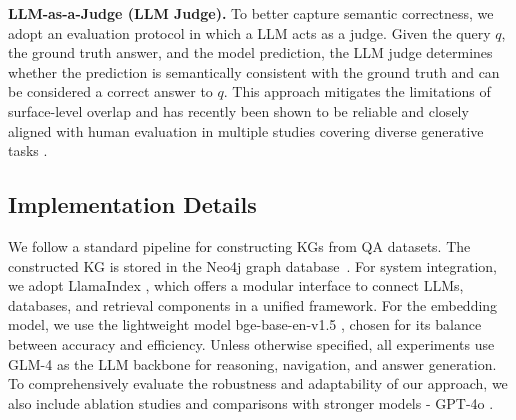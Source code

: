 \documentclass{article}
\theoremstyle{plain}
\theoremstyle{definition}
\theoremstyle{remark}
\begin{document}
\textbf{LLM-as-a-Judge (LLM Judge).}
To better capture semantic correctness, we adopt an evaluation protocol in which a LLM acts as a judge. Given the query $q$, the ground truth answer, and the model prediction, the LLM judge determines whether the prediction is semantically consistent with the ground truth and can be considered a correct answer to $q$. This approach mitigates the limitations of surface-level overlap and has recently been shown to be reliable and closely aligned with human evaluation in multiple studies covering diverse generative tasks \citep{gu2024survey}.

\subsection{Implementation Details}

We follow a standard pipeline for constructing KGs from QA datasets. The constructed KG is stored in the Neo4j graph database~\citep{robinson2015graph, francis2018cypher}. For system integration, we adopt LlamaIndex \citep{Liu_LlamaIndex_2022}, which offers a modular interface to connect LLMs, databases, and retrieval components in a unified framework. For the embedding model, we use the lightweight model bge-base-en-v1.5 \citep{bge2024}, chosen for its balance between accuracy and efficiency. Unless otherwise specified, all experiments use GLM-4 \citep{zhipuai2024glm4} as the LLM backbone for reasoning, navigation, and answer generation. To comprehensively evaluate the robustness and adaptability of our approach, we also include ablation studies and comparisons with stronger models - GPT-4o \citep{openai_gpt4o_2024}.
\end{document}
